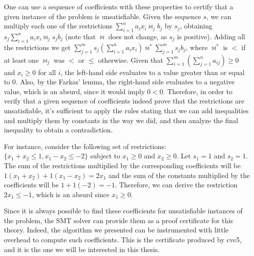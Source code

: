 One can use a sequence of coefficients with these properties to certify that a given instance of the problem is unsatisfiable. Given the sequence $s$, we can multiply each one of the restrictions $\sum_{i = 1}^{n} a_{i} x_{i} \bowtie_{j} b_{j}$ by $s_{j}$, obtaining $ s_{j} \sum_{i = 1}^{n} a_{i} x_{i} \bowtie_{j} s_{j} b_{j}$ (note that $\bowtie$ does not change, as $s_{j}$ is positive). Adding all the restrictions we get $\sum_{j = 1}^{m} s_{j} (\sum_{i = 1}^{n} a_{i} x_{i}) \bowtie^{*} \sum_{j = 1}^{m} s_{j} b_{j}$, where $\bowtie^{*}$ is $<$ if at least one $\bowtie_{j}$ was $<$ or $\le$ otherwise. Given that $\sum_{i = 1}^{m}(\sum_{j = 1}^{n} a_{ij}) \ge 0$ and $x_{i} \ge 0$ for all $i$, the left-hand side evaluates to a value greater than or equal to $0$.
Also, by the Farkas' lemma, the right-hand side evaluates to a negative value, which is an absurd, since it would imply $0 < 0$.
Therefore, in order to verify that a given sequence of coefficients indeed prove that the restrictions are unsatisfiable, it's sufficient to apply the rules stating that we can add inequalities and multiply them by constants in the way we did, and then analyze the final inequality to obtain a contradiction.

For instance, consider the following set of restrictions: $\{x_{1} + x_{2} \le 1, x_{1} - x_{2} \le -2\}$ subject to $x_{1} \ge 0$ and $x_{2} \ge 0$. Let $s_{1} = 1$ and $s_{2} = 1$. The sum of the restrictions multiplied by the corresponding coefficients will be $1 (x_{1} + x_{2}) + 1 (x_{1} - x_{2}) = 2x_{1}$ and the sum of the constants multiplied by the coefficients will be $1 + 1(-2) = -1$. Therefore, we can derive the restriction $2x_{1} \le -1$, which is an absurd since $x_{1} \ge 0$.

Since it is always possible to find these coefficients for unsatisfiable instances of the problem, the SMT solver can provide them as a proof certificate for this theory. Indeed, the algorithm we presented can be instrumented with little overhead to compute such coefficients. This is the certificate produced by cvc5, and it is the one we will be interested in this thesis.
